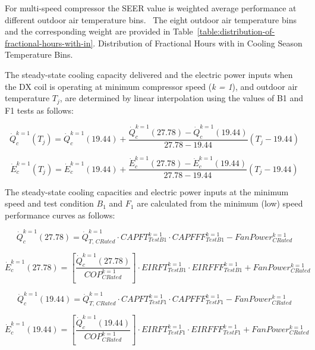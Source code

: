 For multi-speed compressor the SEER value is weighted average performance at different outdoor air temperature bins.~ The eight outdoor air temperature bins and the corresponding weight are provided in Table~\ref{table:distribution-of-fractional-hours-with-in}. Distribution of Fractional Hours with in Cooling Season Temperature Bins.

The steady-state cooling capacity delivered and the electric power inputs when the DX coil is operating at minimum compressor speed (\emph{k = 1}), and outdoor air temperature \(T_{j}\), are determined by linear interpolation using the values of B1 and F1 tests as follows:

\begin{equation}
\dot Q_c^{k = 1}({T_j}) = \dot Q_c^{k = 1}(19.44) + \frac{{\dot Q_c^{k = 1}(27.78) - \dot Q_c^{k = 1}(19.44)}}{{27.78 - 19.44}}\left( {{T_j} - 19.44} \right)
\end{equation}

\begin{equation}
\dot E_c^{k = 1}({T_j}) = \dot E_c^{k = 1}(19.44) + \frac{{\dot E_c^{k = 1}(27.78) - \dot E_c^{k = 1}(19.44)}}{{27.78 - 19.44}}\left( {{T_j} - 19.44} \right)
\end{equation}

The steady-state cooling capacities and electric power inputs at the minimum speed and test condition \(B_{1}\) and \(F_{1}\) are calculated from the minimum (low) speed performance curves as follows:

\begin{equation}
\dot Q_c^{k = 1}(27.78) = \dot Q_{T,\,CRated}^{k = 1} \cdot CAPFT_{TestB1}^{k = 1} \cdot CAPFFF_{TestB1}^{k = 1} - FanPower_{CRated}^{k = 1}
\end{equation}

\begin{equation}
\dot E_c^{k = 1}(27.78) = \left[ {\frac{{\dot Q_c^{k = 1}(27.78)}}{{COP_{CRated}^{k = 1}}}} \right] \cdot EIRFT_{TestB1}^{k = 1} \cdot EIRFFF_{TestB1}^{k = 1} + FanPower_{CRated}^{k = 1}
\end{equation}

\begin{equation}
\dot Q_c^{k = 1}(19.44) = \dot Q_{T,\,CRated}^{k = 1} \cdot CAPFT_{TestF1}^{k = 1} \cdot CAPFFF_{TestF1}^{k = 1} - FanPower_{CRated}^{k = 1}
\end{equation}

\begin{equation}
\dot E_c^{k = 1}(19.44) = \left[ {\frac{{\dot Q_c^{k = 1}(19.44)}}{{COP_{CRated}^{k = 1}}}} \right] \cdot EIRFT_{TestF1}^{k = 1} \cdot EIRFFF_{TestF1}^{k = 1} + FanPower_{CRated}^{k = 1}
\end{equation}

